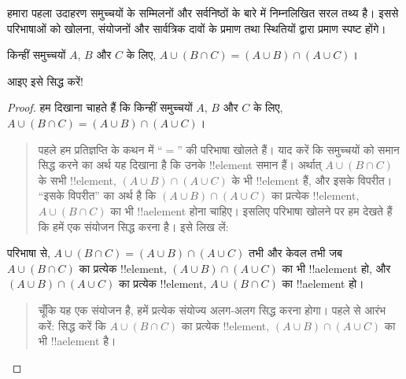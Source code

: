 \documentclass[../../../include/open-logic-section]{subfiles}
\begin{document}


हमारा पहला उदाहरण समुच्चयों के सम्मिलनों और सर्वनिष्ठों के बारे में
निम्नलिखित सरल तथ्य है। इससे परिभाषाओं को खोलना, संयोजनों और सार्वत्रिक
दावों के प्रमाण तथा स्थितियों द्वारा प्रमाण स्पष्ट होंगे।

\begin{prop}
किन्हीं समुच्चयों $A$, $B$ और $C$ के लिए, $A \cup (B \cap C) = (A \cup
B) \cap (A \cup C)$।
\end{prop}

आइए इसे सिद्ध करें!{}

\begin{proof}
हम दिखाना चाहते हैं कि किन्हीं समुच्चयों $A$, $B$ और $C$ के लिए, $A \cup
(B \cap C) = (A \cup B) \cap (A \cup C)$।
\begin{quote}
पहले हम प्रतिज्ञप्ति के कथन में ``$=$'' की परिभाषा खोलते हैं। याद करें कि
समुच्चयों को समान सिद्ध करने का अर्थ यह दिखाना है कि उनके !!{element} समान
हैं। अर्थात् $A \cup (B \cap C)$ के सभी !!{element}, $(A \cup B) \cap
(A \cup C)$ के भी !!{element} हैं, और इसके विपरीत। ``इसके विपरीत'' का
अर्थ है कि $(A \cup B) \cap (A \cup C)$ का प्रत्येक !!{element}, $A
\cup (B \cap C)$ का भी !!a{element} होना चाहिए। इसलिए परिभाषा खोलने पर
हम देखते हैं कि हमें एक संयोजन सिद्ध करना है। इसे लिख लें:
\end{quote}
परिभाषा से, $A \cup (B \cap C) = (A \cup B) \cap (A \cup C)$ तभी और
केवल तभी जब $A \cup (B \cap C)$ का प्रत्येक !!{element}, $(A \cup B)
\cap (A \cup C)$ का भी !!a{element} हो, और $(A \cup B) \cap (A \cup
C)$ का प्रत्येक !!{element}, $A \cup (B \cap C)$ का !!a{element} हो।
\begin{quote}
चूँकि यह एक संयोजन है, हमें प्रत्येक संयोज्य अलग-अलग सिद्ध करना होगा। पहले
से आरंभ करें: सिद्ध करें कि $A \cup (B \cap C)$ का प्रत्येक !!{element},
$(A \cup B) \cap (A \cup C)$ का भी !!a{element} है।


\end{quote}
\end{proof}
\end{document}
